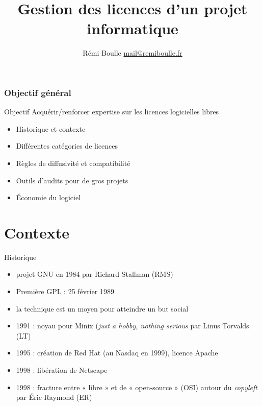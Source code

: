 \documentclass{beamer}
\title[]{Gestion des licences d'un projet informatique}
\author{Rémi Boulle  \href{mailto:mail@remiboulle.fr}{mail@remiboulle.fr}}
\date{}
\institute{}
\begin{document}


\begin{frame}
  \titlepage
\end{frame}



\begin{frame}
\frametitle{Objectif g\'en\'eral}
\begin{alertblock}{Objectif}
  Acquérir/renforcer expertise sur les licences logicielles libres
\end{alertblock}


  \begin{itemize}
  \item Historique et contexte
  \item Différentes catégories de licences
  \item Règles de diffusivité et compatibilité
  \item Outils d'audits pour de gros projets
  \item Économie du logiciel
  \end{itemize}
\end{frame}


\section{Contexte}

\begin{frame}{Historique}
  \begin{itemize}
  \item projet GNU en 1984 par Richard Stallman (RMS)
  \item Première GPL : 25 février 1989
  \item la technique est un moyen pour atteindre un but social
  \item 1991 : noyau pour Minix (\textit{just a hobby, nothing serious} par Linus Torvalds (LT)
  \item 1995 : création de Red Hat (au Nasdaq en 1999), licence Apache
  \item 1998 : libération de Netscape
  \item 1998 : fracture entre « libre » et de « open-source » (OSI) autour du \textit{copyleft} par Éric Raymond (ER)
  \end{itemize}
\end{frame}
\end{document}
